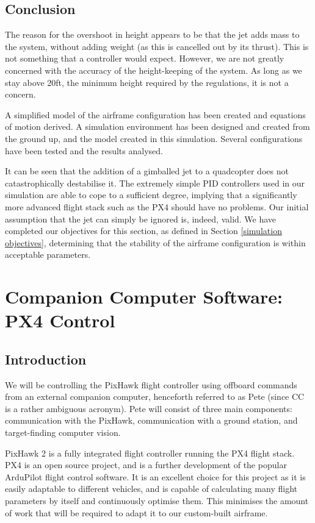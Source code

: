 \documentclass[11pt]{article}
\begin{document}
\subsection{Conclusion}
The reason for the overshoot in height appears to be that the jet adds mass to the system, without adding weight (as this is cancelled out by its thrust). This is not something that a controller would expect. However, we are not greatly concerned with the accuracy of the height-keeping of the system. As long as we stay above 20ft, the minimum height required by the regulations\cite{IMechE_rules}, it is not a concern.

A simplified model of the airframe configuration has been created and equations of motion derived. A simulation environment has been designed and created from the ground up, and the model created in this simulation. Several configurations have been tested and the results analysed.

It can be seen that the addition of a gimballed jet to a quadcopter does not catastrophically destabilise it. The extremely simple PID controllers used in our simulation are able to cope to a sufficient degree, implying that a significantly more advanced flight stack such as the PX4 should have no problems. Our initial assumption that the jet can simply be ignored is, indeed, valid. We have completed our objectives for this section, as defined in Section \ref{simulation objectives}, determining that the stability of the airframe configuration is within acceptable parameters.



\section{Companion Computer Software: PX4 Control}
\subsection{Introduction}\label{PX4 Control}
We will be controlling the PixHawk flight controller using offboard commands from an external companion computer, henceforth referred to as Pete (since CC is a rather ambiguous acronym). Pete will consist of three main components: communication with the PixHawk, communication with a ground station, and target-finding computer vision.

PixHawk 2 is a fully integrated flight controller running the PX4 flight stack. PX4 is an open source project, and is a further development of the popular ArduPilot flight control software. It is an excellent choice for this project as it is easily adaptable to different vehicles, and is capable of calculating many flight parameters by itself and continuously optimise them. This minimises the amount of work that will be required to adapt it to our custom-built airframe.
\end{document}
